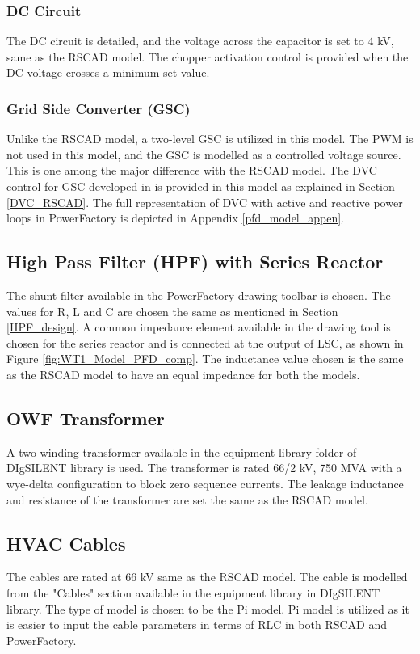 \subsubsection{DC Circuit}
The DC circuit is detailed, and the voltage across the capacitor is set to 4 kV, same as the RSCAD model. The chopper activation control is provided when the \gls{DC} voltage crosses a minimum set value. 

\subsubsection{Grid Side Converter (GSC)}
Unlike the RSCAD model, a two-level \gls{GSC} is utilized in this model. The \gls{PWM} is not used in this model, and the \gls{GSC} is modelled as a controlled voltage source. This is one among the major difference with the RSCAD model. The \gls{DVC} control for \gls{GSC} developed in \cite{korai_dynamic_2019} is provided in this model as explained in Section \ref{DVC_RSCAD}. The full representation of \gls{DVC} with active and reactive power loops in PowerFactory is depicted in Appendix \ref{pfd_model_appen}. 

\subsection{High Pass Filter (HPF) with Series Reactor}
The shunt filter available in the PowerFactory drawing toolbar is chosen. The values for R, L and C are chosen the same as mentioned in Section \ref{HPF_design}. A common impedance element available in the drawing tool is chosen for the series reactor and is connected at the output of \gls{LSC}, as shown in Figure \ref{fig:WT1_Model_PFD_comp}. The inductance value chosen is the same as the RSCAD model to have an equal impedance for both the models.  

\subsection{OWF Transformer}
A two winding transformer available in the equipment library folder of DIgSILENT library is used. The transformer is rated 66/2 kV, 750 MVA with a wye-delta configuration to block zero sequence currents. The leakage inductance and resistance of the transformer are set the same as the RSCAD model.

\subsection{HVAC Cables}
The cables are rated at 66 kV same as the RSCAD model. The cable is modelled from the "Cables" section available in the equipment library in DIgSILENT library. The type of model is chosen to be the Pi model. %
Pi model is utilized as it is easier to input the cable parameters in terms of RLC in both RSCAD and PowerFactory.

